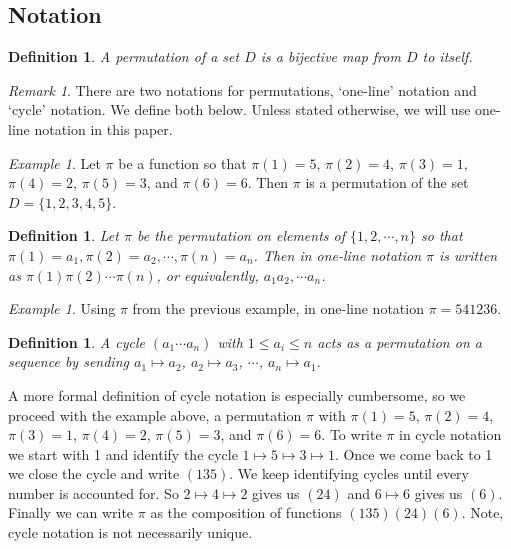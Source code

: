 \documentclass[11pt,letterpaper,twoside,english]{article}
\theoremstyle{theorem}
\newtheorem{definition}[theorem]{Definition}
\theoremstyle{remark}
\newtheorem{remark}[theorem]{Remark}
\newtheorem{example}[theorem]{Example}
\begin{document}
\subsection{Notation}

\begin{definition}
A permutation of a set $D$ is a bijective map from $D$ to itself. 
\end{definition}


\begin{remark}
There are two notations for permutations, `one-line' notation and `cycle' notation. We define both below. Unless stated otherwise, we will use one-line notation in this paper.
\end{remark}

\begin{example}
Let $\pi$ be a function so that $\pi(1)=5$, $\pi(2)=4$, $\pi(3)=1$, $\pi(4)=2$, $\pi(5)=3$, and $\pi(6)=6$. Then $\pi$ is a permutation of the set $D=\{1,2,3,4,5\}$. 
\end{example}

\begin{definition}
Let $\pi$ be the permutation on elements of $\{1,2,\cdots, n\}$ so that $\pi(1)=a_1, \pi(2)=a_2,\cdots, \pi(n)=a_n$. Then in one-line notation $\pi$ is written as $\pi(1)\pi(2)\cdots\pi(n)$, or equivalently, $a_1a_2,\cdots a_n$. 
\end{definition}

\begin{example}
Using $\pi$ from the previous example, in one-line notation $\pi=541236$.
\end{example}

\begin{definition}
A cycle $(a_1\cdots a_n)$ with $1\le a_i\le n$ acts as a permutation on a sequence by sending $a_1\mapsto a_2$, $a_2\mapsto a_3$, $\cdots$, $a_n\mapsto a_1$.
\end{definition}

A more formal definition of cycle notation is especially cumbersome, so we proceed with the example above, a permutation $\pi$ with $\pi(1)=5$, $\pi(2)=4$, $\pi(3)=1$, $\pi(4)=2$, $\pi(5)=3$, and $\pi(6)=6$. To write $\pi$ in cycle notation we start with 1 and identify the cycle $1\mapsto 5\mapsto 3\mapsto 1$. Once we come back to 1 we close the cycle and write $(135)$. We keep identifying cycles until every number is accounted for. So $2\mapsto 4\mapsto 2$ gives us $(24)$ and $6\mapsto 6$ gives us $(6)$. Finally we can write $\pi$ as the composition of functions $(135)(24)(6)$. Note, cycle notation is not necessarily unique. 
\end{document}
